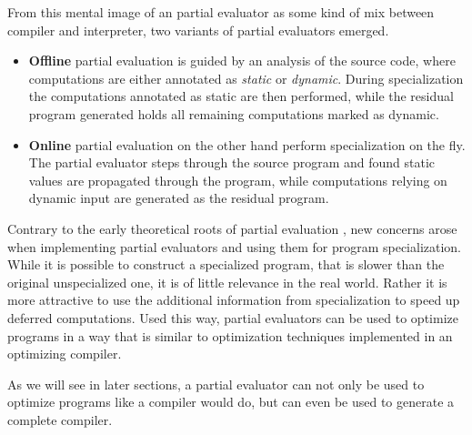 From this mental image of an partial evaluator as some kind of mix between compiler and interpreter, two variants of partial evaluators emerged.

\begin{itemize}
\item
  \textbf{Offline} partial evaluation is guided by an analysis of the source code, where computations are either annotated as \textit{static} or \textit{dynamic}.
  During specialization the computations annotated as static are then performed, while the residual program generated holds all remaining computations marked as dynamic. 

\item
  \textbf{Online} partial evaluation on the other hand perform specialization on the fly.
  The partial evaluator steps through the source program and found static values are propagated through the program, while computations relying on dynamic input are generated as the residual program.~\cite{Ruf_OnlinePartialEval, Cook_TutorialOnlinePartialEvaluation}
\end{itemize}

Contrary to the early theoretical roots of partial evaluation \citationneeded[], new concerns arose when implementing partial evaluators and using them for program specialization.
While it is possible to construct a specialized program, that is slower than the original unspecialized one, it is of little relevance in the real world.
Rather it is more attractive to use the additional information from specialization to speed up deferred computations.
Used this way, partial evaluators can be used to optimize programs in a way that is similar to optimization techniques implemented in an optimizing compiler.

As we will see in later sections, a partial evaluator can not only be used to optimize programs like a compiler would do, but can even be used to generate a complete compiler.

